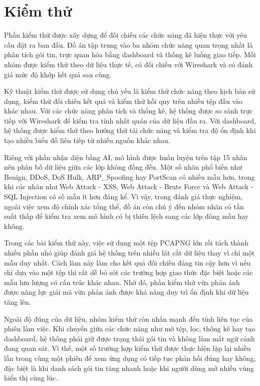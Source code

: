 \documentclass[../DoAn.tex]{subfiles}
\begin{document}
\section{Kiểm thử}
Phần kiểm thử được xây dựng để đối chiếu các chức năng đã hiện thực với yêu cầu đặt ra ban đầu. Đồ án tập trung vào ba nhóm chức năng quan trọng nhất là phân tích gói tin, trực quan hóa bằng dashboard và thống kê luồng giao tiếp. Mỗi nhóm được kiểm thử theo dữ liệu thực tế, có đối chiếu với Wireshark và có đánh giá mức độ khớp kết quả sau cùng.

Kỹ thuật kiểm thử được sử dụng chủ yếu là kiểm thử chức năng theo kịch bản sử dụng, kiểm thử đối chiếu kết quả và kiểm thử hồi quy trên nhiều tệp đầu vào khác nhau. Với các chức năng phân tích và thống kê, hệ thống được so sánh trực tiếp với Wireshark để kiểm tra tính nhất quán của dữ liệu đầu ra. Với dashboard, hệ thống được kiểm thử theo hướng thử tải chức năng và kiểm tra độ ổn định khi tạo nhiều biểu đồ liên tiếp từ nhiều nguồn khác nhau.

Riêng với phần nhận diện bằng AI, mô hình được huấn luyện trên tập 15 nhãn nên phân bố dữ liệu giữa các lớp không đồng đều. Một số nhãn phổ biến như Benign, DDoS, DoS Hulk, ARP\_Spoofing hay PortScan có nhiều mẫu hơn, trong khi các nhãn như Web Attack - XSS, Web Attack - Brute Force và Web Attack - SQL Injection có số mẫu ít hơn đáng kể. Vì vậy, trong đánh giá thực nghiệm, ngoài việc xem độ chính xác tổng thể, đồ án còn chú ý đến nhóm nhãn có tần suất thấp để kiểm tra xem mô hình có bị thiên lệch sang các lớp đông mẫu hay không.

Trong các bài kiểm thử này, việc sử dụng một tệp PCAPNG lớn rồi tách thành nhiều phần nhỏ giúp đánh giá hệ thống trên nhiều lát cắt dữ liệu thay vì chỉ một mẫu duy nhất. Cách làm này làm cho kết quả đối chiếu đáng tin cậy hơn vì nếu chỉ dựa vào một tệp thì rất dễ bỏ sót các trường hợp giao thức đặc biệt hoặc các mẫu lưu lượng có cấu trúc khác nhau. Nhờ đó, phần kiểm thử vừa phản ánh được năng lực giải mã vừa phản ánh được khả năng duy trì ổn định khi dữ liệu tăng lên.

Ngoài độ đúng của dữ liệu, nhóm kiểm thử còn nhấn mạnh đến tính liên tục của phiên làm việc. Khi chuyển giữa các chức năng như mở tệp, lọc, thống kê hay tạo dashboard, hệ thống phải giữ được trạng thái gói tin và không làm mất ngữ cảnh đang quan sát. Vì thế, một số trường hợp kiểm thử được thực hiện lặp lại nhiều lần trong cùng một phiên để xem ứng dụng có tiếp tục phản hồi đúng hay không, đặc biệt là khi danh sách gói tin tăng nhanh hoặc khi người dùng mở nhiều vùng hiển thị cùng lúc.
\end{document}
